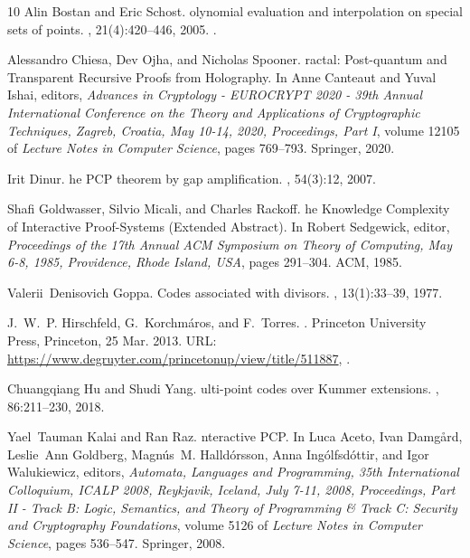 \documentclass[10pt,a4paper]{article}
\theoremstyle{plain}
\theoremstyle{plain}
\theoremstyle{definition}
\theoremstyle{remark}
\theoremstyle{plain}
\begin{document}
\begin{thebibliography}{10}
Alin {Bostan} and Eric {Schost}.
olynomial evaluation and interpolation on special sets of points.
, 21(4):420--446, 2005.
\newblock \href {https://doi.org/10.1016/j.jco.2004.09.009}
  {}.

Alessandro Chiesa, Dev Ojha, and Nicholas Spooner.
ractal: {P}ost-quantum and {T}ransparent {R}ecursive {P}roofs from
  {H}olography.
\newblock In Anne Canteaut and Yuval Ishai, editors, {\em Advances in
  Cryptology - {EUROCRYPT} 2020 - 39th Annual International Conference on the
  Theory and Applications of Cryptographic Techniques, Zagreb, Croatia, May
  10-14, 2020, Proceedings, Part {I}}, volume 12105 of {\em Lecture Notes in
  Computer Science}, pages 769--793. Springer, 2020.

Irit Dinur.
he {{P}{C}{P}} theorem by gap amplification.
, 54(3):12, 2007.

Shafi Goldwasser, Silvio Micali, and Charles Rackoff.
he {K}nowledge {C}omplexity of {I}nteractive {P}roof-{S}ystems
  ({E}xtended {A}bstract).
\newblock In Robert Sedgewick, editor, {\em Proceedings of the 17th Annual
  {ACM} Symposium on Theory of Computing, May 6-8, 1985, Providence, Rhode
  Island, {USA}}, pages 291--304. {ACM}, 1985.

Valerii~Denisovich Goppa.
\newblock Codes associated with divisors.
, 13(1):33--39, 1977.

J.~W.~P. Hirschfeld, G.~Korchmáros, and F.~Torres.
.
\newblock Princeton University Press, Princeton, 25 Mar. 2013.
\newblock URL: \url{https://www.degruyter.com/princetonup/view/title/511887},
  \href {https://doi.org/10.1515/9781400847419}
  {}.

Chuangqiang {Hu} and Shudi {Yang}.
ulti-point codes over {K}ummer extensions.
, 86:211--230, 2018.

Yael~Tauman Kalai and Ran Raz.
nteractive {{P}{C}{P}}.
\newblock In Luca Aceto, Ivan Damg{\aa}rd, Leslie~Ann Goldberg, Magn{\'{u}}s~M.
  Halld{\'{o}}rsson, Anna Ing{\'{o}}lfsd{\'{o}}ttir, and Igor Walukiewicz,
  editors, {\em Automata, Languages and Programming, 35th International
  Colloquium, {ICALP} 2008, Reykjavik, Iceland, July 7-11, 2008, Proceedings,
  Part {II} - Track {B:} Logic, Semantics, and Theory of Programming {\&} Track
  {C:} Security and Cryptography Foundations}, volume 5126 of {\em Lecture
  Notes in Computer Science}, pages 536--547. Springer, 2008.


\end{thebibliography}
\end{document}
